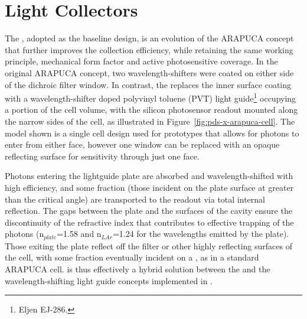 

\section{Light Collectors}
\label{sec:fdsp-pd-lc}

The , adopted as the baseline design, is an evolution of the ARAPUCA concept that further improves the collection efficiency, while retaining the same working principle, mechanical form factor and active photosensitive coverage. 
 In the original ARAPUCA concept, two wavelength-shifters were coated on either side of the dichroic filter window. 
 In contrast, the  replaces the inner surface coating with a wavelength-shifter doped polyvinyl toluene (PVT)  light guide\footnote{Eljen EJ-286\texttrademark{}.} occupying a portion of the cell volume, with the silicon photosensor readout mounted along the narrow sides of the cell, as illustrated in Figure~\ref{fig:pds-x-arapuca-cell}. The model shown is a single cell design used for prototypes that allows for photons to enter from either face, however one window can be replaced with an opaque reflecting surface for sensitivity through just one face.

Photons entering the lightguide plate are absorbed and wavelength-shifted with high efficiency, and some fraction (those incident on the plate surface at greater than the critical angle) are transported to the readout via total internal reflection. The  gaps between the plate and the surfaces of the cavity ensure the discontinuity of the refractive index that contributes to effective trapping of the photons (n$_{plate}$=1.58 and n$_{LAr}$=1.24 for the wavelengths emitted by the plate).
Those exiting the plate reflect off the filter or other highly reflecting surfaces of the cell, with some fraction eventually incident on a , as in a standard ARAPUCA cell.
 is thus effectively a hybrid solution between the  and the wavelength-shifting light guide concepts implemented in .


